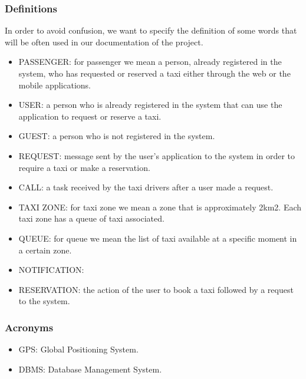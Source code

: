 \subsubsection{Definitions}
	In order to avoid confusion, we want to specify the definition of some words that will be often used in our documentation of the project. 
	\begin{itemize}
		\item PASSENGER: for passenger we mean a person, already registered in the system, who has requested or reserved a taxi either through the web or the mobile applications.
		\item USER: a person who is already registered in the system that can use the application to request or reserve a taxi.
		\item GUEST:  a person who is not registered in the system.
		\item REQUEST: message sent by the user's application to the system in order to require a taxi or make a reservation.
		\item CALL: a task received by the taxi drivers after a user made a request.
		\item TAXI ZONE: for taxi zone we mean a zone that is approximately 2km2. Each taxi zone has a queue of taxi associated. 
		\item QUEUE: for queue we mean the list of taxi available at a specific moment in a certain zone.
		\item NOTIFICATION: 
		\item RESERVATION: the action of the user to book a taxi followed by a request to the system.
	\end{itemize}

\subsubsection{Acronyms}
	\begin{itemize}
		\item GPS: Global Positioning System.
		\item DBMS: Database Management System.
	\end{itemize}